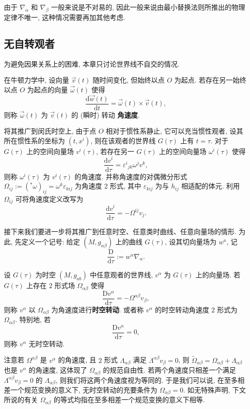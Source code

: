 \begin{remark}
	由于 $\nabla_\alpha$ 和 $\nabla_\beta$ 一般来说是不对易的, 因此一般来说由最小替换法则所推出的物理定律不唯一, 这种情况需要再加其他考虑.
\end{remark}

\subsection{无自转观者}
\label{rotation}
\begin{remark}
	为避免因果关系上的困难, 本章只讨论世界线不自交的情况.
\end{remark}

在牛顿力学中, 设向量 $\vec{v}(t)$ 随时间变化, 但始终以点 $O$ 为起点. 若存在另一始终以点 $O$ 为起点的向量 $\vec{\omega}(t)$ 使得
\[ \frac{\mathrm{d} \vec{w}(t)}{\mathrm{d} t}=\vec{\omega}(t)\times\vec{v}(t), \]
则称 $\vec{\omega}(t)$ 为 $\vec{v}(t)$ 的 (瞬时) 转动 {\bf 角速度}.

将其推广到闵氏时空上, 由于点 $O$ 相对于惯性系静止, 它可以充当惯性观者, 设其所在惯性系的坐标为 $(t,x^i)$, 则在该观者的世界线 $G(\tau)$ 上有 $t=\tau$. 对于 $G(\tau)$ 上的空间向量场 $v^i(\tau)$, 若存在另一 $G(\tau)$ 上的空间向量场 $\omega^i(\tau)$ 使得
\[ \frac{\mathrm{d} v^i}{\mathrm{d} \tau}=\varepsilon^i{}_{jk}\omega^jv^k, \] 
则称 $\omega^i(\tau)$ 为 $v^i(\tau)$ 的角速度. 并称角速度的对偶微分形式 $\Omega_{ij}:=({}^{*}\omega)_{ij}=\omega^k\varepsilon_{kij}$ 为角速度 $2$ 形式, 其中 $\varepsilon_{kij}$ 为与 $h_{ij}$ 相适配的体元. 利用 $\Omega_{ij}$ 可将角速度定义改写为
\[ \frac{\mathrm{d} v^i}{\mathrm{d} \tau}=-\Omega^{ij}v_j. \] 

接下来我们要进一步将其推广到任意时空、任意类时曲线、任意向量场的情形. 为此, 先定义一个记号: 给定 $(M,g_{\alpha\beta})$ 上的曲线 $G(\tau)$, 设其切向量场为 $w^a$, 记
\[ \frac{\mathrm{D}}{\mathrm{d}\tau}:=w^\alpha\nabla_\alpha. \] 
\begin{definition}[时空转动]
	设 $G(\tau)$ 为时空 $(M,g_{ab})$ 中任意观者的世界线, $v^\alpha$ 为 $G(\tau)$ 上的向量场. 若 $G(\tau)$ 上存在 $2$ 形式场 $\Omega_{\alpha\beta}$ 使得
	\[ \frac{\mathrm{D}v^\alpha}{\mathrm{d}\tau}=-\Omega^{\alpha\beta}v_\beta, \]
	则称 $v^\alpha$ 以 $\Omega_{\alpha\beta}$ 为角速度进行{\bf 时空转动}. 或者称 $v^\alpha$ 的时空转动角速度 $2$ 形式为 $\Omega_{\alpha\beta}$. 特别地, 若
	\[ \frac{\mathrm{D}v^\alpha}{\mathrm{d}\tau}=0, \]
	则称 $v^\alpha$ 无时空转动.
\end{definition}

注意若 $\Omega^{\alpha\beta}$ 是 $v^\alpha$ 的角速度, 且 $2$ 形式 $\Lambda_{\alpha\beta}$ 满足 $\Lambda^{\alpha\beta}v_\beta=0$, 则 $\tilde{\Omega}_{\alpha\beta}=\Omega_{\alpha\beta}+\Lambda_{\alpha\beta}$ 也是 $v^\alpha$ 的角速度, 这体现了 $\Omega_{\alpha\beta}$ 的规范自由性. 若两个角速度只相差一个满足 $\Lambda^{\alpha\beta}v_\beta=0$ 的 $\Lambda_{\alpha\beta}$, 则我们将这两个角速度视为等同的. 于是我们可以说, 在至多相差一个规范变换的意义下, 无时空转动的充要条件为 $\Omega_{\alpha\beta}=0$. 如无特殊声明, 下文所说的有关 $\Omega_{\alpha\beta}$ 的等式均指在至多相差一个规范变换的意义下相等.

